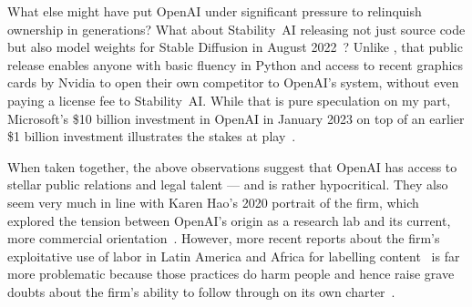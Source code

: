 What else might have put OpenAI under significant pressure to relinquish
ownership in generations? What about Stability~AI releasing not just source code
but also model weights for Stable Diffusion in August
2022~\cite{StabilityAI2022}? Unlike \DALLE, that public release enables anyone
with basic fluency in Python and access to recent graphics cards by Nvidia to
open their own competitor to OpenAI's system, without even paying a license fee
to Stability~AI. While that is pure speculation on my part, Microsoft's \$10
billion investment in OpenAI in January 2023 on top of an earlier \$1 billion
investment illustrates the stakes at play~\cite{Bass2023}.

When taken together, the above observations suggest that OpenAI has access to
stellar public relations and legal talent --- and is rather hypocritical. They
also seem very much in line with Karen Hao's 2020 portrait of the firm, which
explored the tension between OpenAI's origin as a research lab and its current,
more commercial orientation~\cite{Hao2020}. However, more recent reports about
the firm's exploitative use of labor in Latin America and Africa for labelling
content~\cite{HaoHernandez2022,Perrigo2023a} is far more problematic because
those practices do harm people and hence raise grave doubts about the firm's
ability to follow through on its own charter~\cite{OpenAI2018}.

